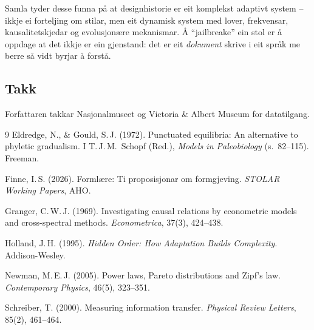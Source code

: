 \documentclass[10pt, a4paper, twocolumn]{article}
\begin{document}
Samla tyder desse funna p\aa{} at designhistorie er eit komplekst adaptivt system -- ikkje ei forteljing om stilar, men eit dynamisk system med lover, frekvensar, kausalitetskjedar og evolusjon\ae{}re mekanismar. \AA{} ``jailbreake'' ein stol er \aa{} oppdage at det ikkje er ein gjenstand: det er eit \emph{dokument} skrive i eit spr\aa{}k me berre s\aa{} vidt byrjar \aa{} forst\aa{}.


\small
\subsection*{Takk}
Forfattaren takkar Nasjonalmuseet og Victoria \& Albert Museum for datatilgang.



\begin{thebibliography}{9}
Eldredge, N., \& Gould, S.\,J. (1972). Punctuated equilibria: An alternative to phyletic gradualism. I T.\,J.\,M.~Schopf (Red.), \textit{Models in Paleobiology} (s.~82--115). Freeman.

Finne, I.\,S. (2026). Forml\ae{}re: Ti proposisjonar om formgjeving. \textit{STOLAR Working Papers}, AHO.

Granger, C.\,W.\,J. (1969). Investigating causal relations by econometric models and cross-spectral methods. \textit{Econometrica}, 37(3), 424--438.

Holland, J.\,H. (1995). \textit{Hidden Order: How Adaptation Builds Complexity}. Addison-Wesley.

Newman, M.\,E.\,J. (2005). Power laws, Pareto distributions and Zipf's law. \textit{Contemporary Physics}, 46(5), 323--351.

Schreiber, T. (2000). Measuring information transfer. \textit{Physical Review Letters}, 85(2), 461--464.
\end{thebibliography}
\end{document}
